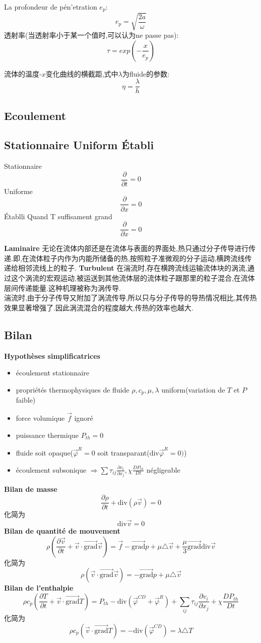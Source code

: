 \documentclass{article}
\begin{document}
La profondeur de p\'en'etration $e_p$:$$e_p=\sqrt{\frac{2a}{\omega}}$$
透射率(当透射率小于某一个值时,可以认为ne passe pas):$$\tau = exp(-\frac{x}{e_p})$$


流体的温度-$x$变化曲线的横截距,式中$\lambda$为fluide的参数:$$\eta=\frac{\lambda }{h}$$

\subsection{Ecoulement}
\subsection{Stationnaire Uniform \'Etabli}
Stationnaire
$$ \frac{\partial  }{\partial t}=0 $$
Uniforme
$$ \frac{\partial  }{\partial x}=0 $$
\'Etablli
Quand T suffisament grand
$$ \frac{\partial  }{\partial x}=0 $$

\textbf{Laminaire}
无论在流体内部还是在流体与表面的界面处,热只通过分子传导进行传递.即,在流体粒子内作为内能所储备的热,按照粒子准微观的分子运动,横跨流线传递给相邻流线上的粒子.
\textbf{Turbulent}
在湍流时,存在横跨流线运输流体块的涡流,通过这个涡流的宏观运动,被运送到其他流体层的流体粒子跟那里的粒子混合,在流体层间传递能量.这种机理被称为涡传导.\\
湍流时,由于分子传导又附加了涡流传导,所以只与分子传导的导热情况相比,其传热效果显著增强了.因此涡流混合的程度越大,传热的效率也越大.

\subsection{Bilan}
\textbf{Hypoth\`eses simplificatrices}
\begin{itemize}
\item \'ecoulement stationnaire
\item propri\'et\'es thermophysiques de fluide $\rho, c_p, \mu,\lambda $ uniform(variation de $T$ et $P$ faible)
\item force volumique $\vec{f}$ ignor\'e
\item puissance thermique $P_{th}=0$
\item fluide soit opaque($\vec{\varphi}^R = 0$ soit transparant($\mbox{div} \vec{\varphi}^R=0)$)
\item \'ecoulement subsonique $\Rightarrow \sum \tau_{ij}\frac{\partial  v_i}{\partial x_j},\chi\frac{ DP_{th}}{Dt}$ n\'egligeable
\end{itemize}
\textbf{Bilan de masse}
$$\frac{\partial  \rho}{\partial t} + \mbox{div} (\rho \vec{v})=0 $$
化简为
$$\mbox{div} \vec{v}=0$$
\textbf{Bilan de quantit\'e de mouvement}
$$
\rho(\frac{\partial  \vec{v}}{\partial t}+ \vec{v}\cdot \vec{\mbox{grad}}\vec{v}) =  \vec{f} - \vec{\mbox{grad}} p + \mu \triangle\vec{v} + \frac{\mu}{3}\vec{\mbox{grad}} \mbox{div} \vec{v}
$$
化简为
$$
\rho(  \vec{v}\cdot \vec{\mbox{grad}}\vec{v}) =   - \vec{\mbox{grad}} p + \mu \triangle\vec{v}
$$
\textbf{Bilan de l'enthalpie}
$$
\rho c_p (\frac{\partial  T}{\partial t} + \vec{v}\cdot \vec{\mbox{grad}} T)=P_{th} - \mbox{div} (\vec{\varphi}^{CD}+\vec{\varphi}^R) +  \sum_{ij} \tau_{ij}\frac{\partial  v_i}{\partial x_j} + \chi\frac{ DP_{th}}{Dt}
$$
化简为
$$
\rho c_p ( \vec{v}\cdot \vec{\mbox{grad}} T)=- \mbox{div} (\vec{\varphi}^{CD}) =\lambda \triangle T
$$
\end{document}
